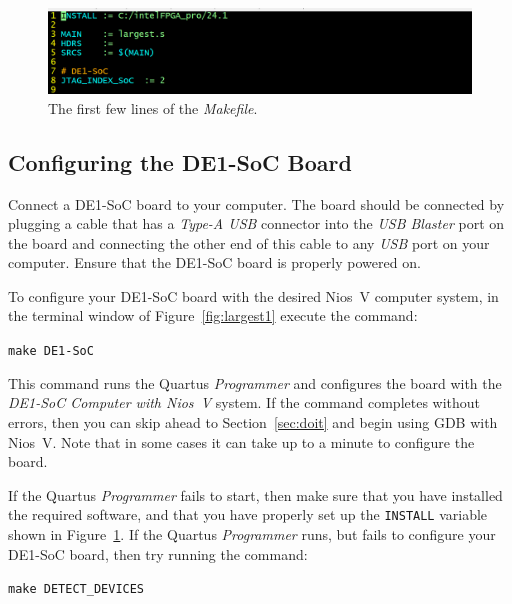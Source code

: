 \documentclass[11pt, twoside, pdftex]{article}
\begin{document}
{\begin{figure}[h]
    \begin{center}
        \includegraphics[scale=.5]{figures/firstfew.png}
        \caption{The first few lines of the {\it Makefile}.}
        \label{fig:firstfew}
    \end{center}
\end{figure}

\subsection{Configuring the DE1-SoC Board}

Connect a DE1-SoC board to your computer. The board should be connected by plugging
a cable that has a {\it Type-A USB} connector into the {\it USB Blaster} port on the board 
and connecting the other end of this cable to any {\it USB} port on your computer. Ensure 
that the DE1-SoC board is properly powered on.

To configure your DE1-SoC board with the desired Nios~V computer system, in the terminal
window of Figure~\ref{fig:largest1} execute the command:

\texttt{make DE1-SoC} 

This command runs the Quartus {\it Programmer} and configures the board with the 
{\it DE1-SoC Computer with Nios~V} system. If the command completes without errors, then you 
can skip ahead to Section~\ref{sec:doit} and begin using GDB with Nios~V. Note that in
some cases it can take up to a minute to configure the board. 

If the Quartus {\it Programmer} fails to start, then make sure that you have installed the
required software, and that you have properly set up the \texttt{INSTALL} variable shown
in Figure~\ref{fig:firstfew}. If the Quartus {\it Programmer} runs, but fails to configure 
your DE1-SoC board, then try running the command:

\texttt{make DETECT\_DEVICES}

}
\end{document}
